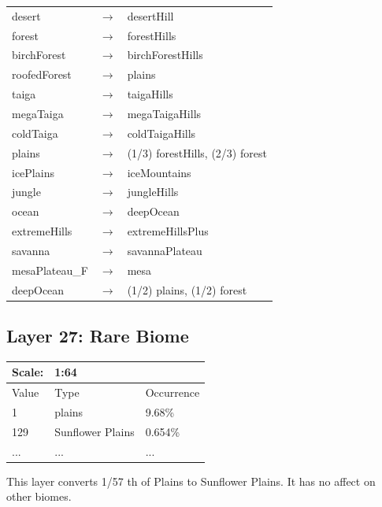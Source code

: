 \documentclass{article}
\begin{document}
	\begin{tabular}{l c l}
		desert & $\longrightarrow$ & desertHill\\
		forest & $\longrightarrow$ & forestHills\\
		birchForest & $\longrightarrow$ & birchForestHills\\
		roofedForest & $\longrightarrow$ & plains\\
		taiga & $\longrightarrow$ & taigaHills\\
		megaTaiga & $\longrightarrow$ & megaTaigaHills\\
		coldTaiga & $\longrightarrow$ & coldTaigaHills\\
		plains & $\longrightarrow$ & (1/3) forestHills, (2/3) forest\\
		icePlains & $\longrightarrow$ & iceMountains\\
		jungle & $\longrightarrow$ & jungleHills\\
		ocean & $\longrightarrow$ & deepOcean\\
		extremeHills & $\longrightarrow$ & extremeHillsPlus\\
		savanna & $\longrightarrow$ & savannaPlateau\\
		mesaPlateau\_F & $\longrightarrow$ & mesa\\
		deepOcean & $\longrightarrow$ & (1/2) plains, (1/2) forest
	\end{tabular}

	\subsection{Layer 27: Rare Biome}
	\begin{tabular}{|l|l|l|}\hline
		Scale: & \multicolumn{2}{|l|}{1:64} \\\hline\hline
		Value  & Type             & Occurrence \\\hline
		1      & plains           & 9.68\%\\\hline
		129    & Sunflower Plains & 0.654\%\\\hline
		...    & ...              & ...\\\hline
	\end{tabular}

	\medskip\noindent
	This layer converts 1/57 th of Plains to Sunflower Plains. It has no affect on other biomes.
\end{document}
